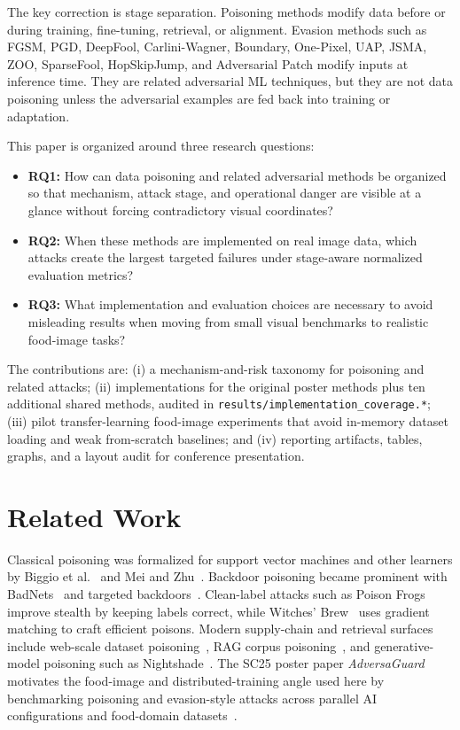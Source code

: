 \documentclass[conference]{IEEEtran}
\begin{document}
The key correction is stage separation. Poisoning methods modify data before or during training, fine-tuning, retrieval, or alignment. Evasion methods such as FGSM, PGD, DeepFool, Carlini-Wagner, Boundary, One-Pixel, UAP, JSMA, ZOO, SparseFool, HopSkipJump, and Adversarial Patch modify inputs at inference time. They are related adversarial ML techniques, but they are not data poisoning unless the adversarial examples are fed back into training or adaptation.

This paper is organized around three research questions:
\begin{itemize}
    \item \textbf{RQ1:} How can data poisoning and related adversarial methods be organized so that mechanism, attack stage, and operational danger are visible at a glance without forcing contradictory visual coordinates?
    \item \textbf{RQ2:} When these methods are implemented on real image data, which attacks create the largest targeted failures under stage-aware normalized evaluation metrics?
    \item \textbf{RQ3:} What implementation and evaluation choices are necessary to avoid misleading results when moving from small visual benchmarks to realistic food-image tasks?
\end{itemize}

The contributions are: (i) a mechanism-and-risk taxonomy for poisoning and related attacks; (ii) implementations for the original poster methods plus ten additional shared methods, audited in \texttt{results/implementation\_coverage.*}; (iii) pilot transfer-learning food-image experiments that avoid in-memory dataset loading and weak from-scratch baselines; and (iv) reporting artifacts, tables, graphs, and a layout audit for conference presentation.

\section{Related Work}

Classical poisoning was formalized for support vector machines and other learners by Biggio et al.~\cite{biggio2012} and Mei and Zhu~\cite{mei2015}. Backdoor poisoning became prominent with BadNets~\cite{badnets} and targeted backdoors~\cite{targetedbackdoor}. Clean-label attacks such as Poison Frogs~\cite{poisonfrogs} improve stealth by keeping labels correct, while Witches' Brew~\cite{witchesbrew} uses gradient matching to craft efficient poisons. Modern supply-chain and retrieval surfaces include web-scale dataset poisoning~\cite{webscale}, RAG corpus poisoning~\cite{poisonedrag}, and generative-model poisoning such as Nightshade~\cite{nightshade}. The SC25 poster paper \emph{AdversaGuard} motivates the food-image and distributed-training angle used here by benchmarking poisoning and evasion-style attacks across parallel AI configurations and food-domain datasets~\cite{adversaguard}.
\end{document}
